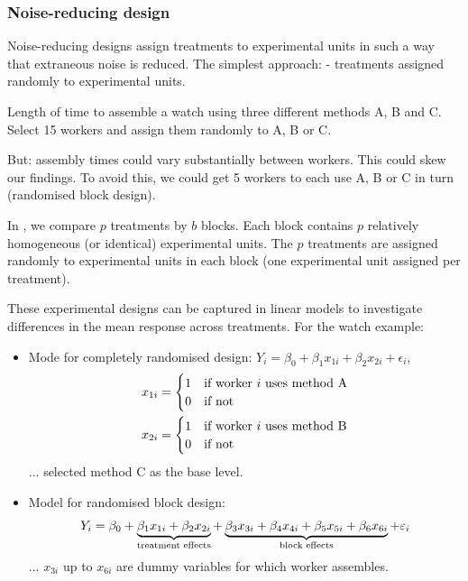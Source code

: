 \subsubsection{Noise-reducing design}

Noise-reducing designs assign treatments to experimental units in such a way that extraneous noise is reduced. The simplest approach:  - treatments assigned randomly to experimental units.

\begin{example}
	Length of time to assemble a watch using three different methods A, B and C. Select 15 workers and assign them randomly to A, B or C.
	
	But: assembly times could vary substantially between workers. This could skew our findings. To avoid this, we could get 5 workers to each use A, B or C in turn (randomised block design).
\end{example}

In , we compare $p$ treatments by $b$ blocks. Each block contains $p$ relatively homogeneous (or identical) experimental units. The $p$ treatments are assigned randomly to experimental units in each block (one experimental unit assigned per treatment).

These experimental designs can be captured in linear models to investigate differences in the mean response across treatments. For the watch example:
\begin{itemize}
	\item Mode for completely randomised design: $Y_i = \beta_0 + \beta_1x_{1i} + \beta_2x_{2i} + \epsilon_i$,
	\begin{align}
		x_{1i} &= \begin{cases}
		1 & \text{if worker $i$ uses method A} \\ 0 & \text{if not}
		\end{cases} \notag \\
		x_{2i} &= \begin{cases}
		1 & \text{if worker $i$ uses method B} \\ 0 & \text{if not}
		\end{cases} \notag
	\end{align}
	... selected method C as the base level.
	\item Model for randomised block design:
	\begin{align}
		Y_ i = \beta_0 + \underbrace{\beta_1x_{1i} + \beta_2x_{2i}}_{\text{treatment effects}} + \underbrace{\beta_3x_{3i} + \beta_4x_{4i} + \beta_5x_{5i} + \beta_6x_{6i}}_{\text{block effects}} + \epsilon_i \notag
	\end{align}
	... $x_{3i}$ up to $x_{6i}$ are dummy variables for which worker assembles.
\end{itemize}

